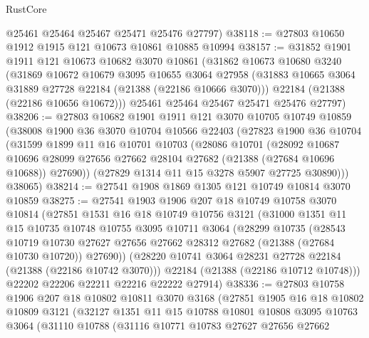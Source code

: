 \begin{lexlean}{RustCore}
\begin{coremodule}
      @25461
      @25464
      @25467
      @25471
      @25476
      @27797)
@38118 := @27803 @10650 @1912 @1915 @121 @10673 @10861 @10885 @10994
@38157 := @31852
    @1901
    @1911
    @121
    @10673
    @10682
    @3070
    @10861
    (@31862
      @10673
      @10680
      @3240
      (@31869
        @10672
        @10679
        @3095
        @10655
        @3064
        @27958
        (@31883 @10665 @3064 @31889 @27728 @22184 (@21388 (@22186 @10666 @3070)))
        @22184
        (@21388 (@22186 @10656 @10672)))
      @25461
      @25464
      @25467
      @25471
      @25476
      @27797)
@38206 := @27803
    @10682
    @1901
    @1911
    @121
    @3070
    @10705
    @10749
    @10859
    (@38008
      @1900
      @36
      @3070
      @10704
      @10566
      @22403
      (@27823
        @1900
        @36
        @10704
        (@31599
          @1899
          @11
          @16
          @10701
          @10703
          (@28086
            @10701
            (@28092
              @10687
              @10696
              @28099
              @27656
              @27662
              @28104
              @27682
              (@21388 (@27684 @10696 @10688))
              @27690))
          (@27829 @1314 @11 @15 @3278 @5907 @27725 @30890)))
      @38065)
@38214 := @27541 @1908 @1869 @1305 @121 @10749 @10814 @3070 @10859
@38275 := @27541
    @1903
    @1906
    @207
    @18
    @10749
    @10758
    @3070
    @10814
    (@27851
      @1531
      @16
      @18
      @10749
      @10756
      @3121
      (@31000
        @1351
        @11
        @15
        @10735
        @10748
        @10755
        @3095
        @10711
        @3064
        (@28299
          @10735
          (@28543
            @10719
            @10730
            @27627
            @27656
            @27662
            @28312
            @27682
            (@21388 (@27684 @10730 @10720))
            @27690))
        (@28220 @10741 @3064 @28231 @27728 @22184 (@21388 (@22186 @10742 @3070)))
        @22184
        (@21388 (@22186 @10712 @10748)))
      @22202
      @22206
      @22211
      @22216
      @22222
      @27914)
@38336 := @27803
    @10758
    @1906
    @207
    @18
    @10802
    @10811
    @3070
    @3168
    (@27851
      @1905
      @16
      @18
      @10802
      @10809
      @3121
      (@32127
        @1351
        @11
        @15
        @10788
        @10801
        @10808
        @3095
        @10763
        @3064
        (@31110
          @10788
          (@31116
            @10771
            @10783
            @27627
            @27656
            @27662

\end{coremodule}
\end{lexlean}

